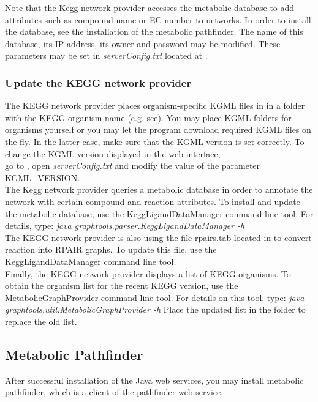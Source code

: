 \documentclass{book}
\begin{document}
Note that the Kegg network provider accesses the metabolic database to add attributes
such as compound name or EC number to networks.
In order to install the database, see the installation of the metabolic pathfinder.
The name of this database, its IP address, its owner and password may be modified.
These parameters may be set in \textit{serverConfig.txt}
located at .

\subsubsection{Update the KEGG network provider}

The KEGG network provider places organism-specific KGML files in 
in a folder with the KEGG organism name (e.g. sce).
You may place KGML folders for organisms yourself or you may let the program download
required KGML files on the fly. In the latter case, make sure that the KGML version is set correctly.
To change the KGML version displayed in the web interface,\\
go to , open
\textit{serverConfig.txt} and modify the value of the parameter KGML\_VERSION.\\

The Kegg network provider queries a metabolic database in order to annotate the network
with certain compound and reaction attributes.
To install and update the metabolic database, use the KeggLigandDataManager command line tool.
For details, type:
\textit{java graphtools.parser.KeggLigandDataManager -h}\\

The KEGG network provider is also using the file rpairs.tab located in 
to convert reaction into RPAIR graphs. To update this file, use the KeggLigandDataManager command line tool.\\

Finally, the KEGG network provider displays a list of KEGG organisms. To obtain the
organism list for the recent KEGG version, use the MetabolicGraphProvider command line
tool. For details on this tool, type: \textit{java graphtools.util.MetabolicGraphProvider -h}
Place the updated list in the folder  to replace the old list.

\subsection{Metabolic Pathfinder}
After successful installation of the Java web services, you may install metabolic pathfinder,
which is a client of the pathfinder web service.
\end{document}

